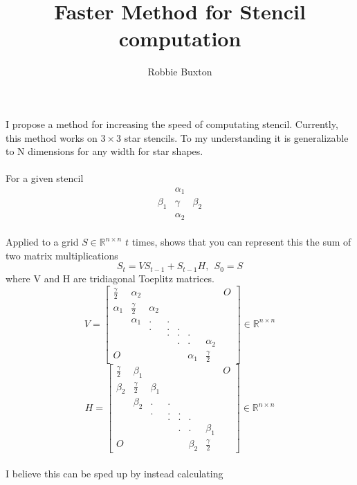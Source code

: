 \documentclass{article}
\begin{document}
\title{Faster Method for Stencil computation}
\author{Robbie Buxton}
\maketitle
I propose a method for increasing the speed of computating stencil. 
Currently, this method works on $3\times 3$ star stencils. To my understanding it is generalizable to N dimensions for any width for star shapes. \\ \\
For a given stencil
\newcommand{\stencilTop}{\alpha_{1}}
\newcommand{\stencilLeft}{\beta_{1}}
\newcommand{\stencilMiddle}{\gamma}
\newcommand{\stencilRight}{\beta_{2}}
\newcommand{\stencilBottom}{\alpha_{2}}
\[\begin{matrix} 
	& \stencilTop  & \\
	\stencilLeft  & \stencilMiddle  & \stencilRight  \\
	& \stencilBottom & 
\end{matrix}\] \\
\newcommand{\verticalBands}{V}
\newcommand{\horizontalBands}{H}
\newcommand{\sourceGrid}{S}
Applied to a grid $\sourceGrid \in \mathbb{R}^{n \times n}$ $t$ times,
\cite{10.1145/3524059.3532392} shows that you can represent this the sum of two matrix multiplications
\[ \sourceGrid_t = \verticalBands \sourceGrid_{t-1} + \sourceGrid_{t-1} \horizontalBands, \> \> S_0 = S\]
where V and H are tridiagonal Toeplitz matrices. 
\[ \verticalBands = 
\begin{bmatrix}
	\frac{\stencilMiddle}{2} & \stencilBottom & & & & & & O \\ 
	\stencilTop & \frac{\stencilMiddle}{2} & \stencilBottom & & & & & \\
	& \stencilTop & . & . & & & & \\
	& &  . & . & . & & &  \\
	& & & . & . & . & & \\
	& & & & . & .& \stencilBottom \\
	O & & & & &  \stencilTop & \frac{\stencilMiddle}{2}
\end{bmatrix} \in \mathbb{R}^{n\times n} \]
\[\horizontalBands = 
\begin{bmatrix}
	\frac{\stencilMiddle}{2} & \stencilLeft & & & & & & O \\ 
	\stencilRight & \frac{\stencilMiddle}{2} & \stencilLeft & & & & & \\
	& \stencilRight & . & . & & & & \\
	& &  . & . & . & & &  \\
	& & & . & . & . & & \\
	& & & & . & .& \stencilLeft \\
	O & & & & &  \stencilRight & \frac{\stencilMiddle}{2}
\end{bmatrix} \in \mathbb{R}^{n\times n}\] \\ 
I believe this can be sped up by instead calculating
\newcommand{\innerSum}{C}
\newcommand{\verticalBasis}{{X_V}}
\newcommand{\verticalEigens}{{\Lambda_V}}
\newcommand{\horizontalBasis}{{X_H}}
\newcommand{\horizontalEigens}{{\Lambda_H}}
\newcommand{\transformedSourceGrid}{T}
\end{document}
